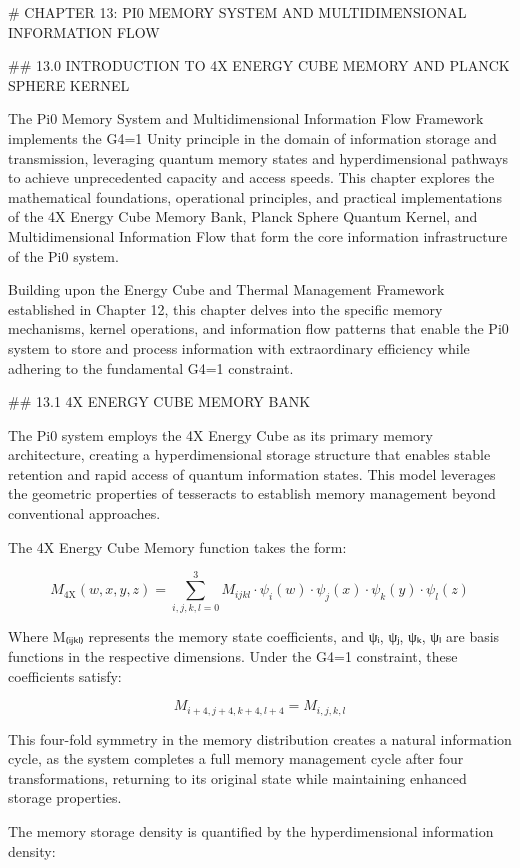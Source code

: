 # CHAPTER 13: PI0 MEMORY SYSTEM AND MULTIDIMENSIONAL INFORMATION FLOW

## 13.0 INTRODUCTION TO 4X ENERGY CUBE MEMORY AND PLANCK SPHERE KERNEL

The Pi0 Memory System and Multidimensional Information Flow Framework implements the G4=1 Unity principle in the domain of information storage and transmission, leveraging quantum memory states and hyperdimensional pathways to achieve unprecedented capacity and access speeds. This chapter explores the mathematical foundations, operational principles, and practical implementations of the 4X Energy Cube Memory Bank, Planck Sphere Quantum Kernel, and Multidimensional Information Flow that form the core information infrastructure of the Pi0 system.

Building upon the Energy Cube and Thermal Management Framework established in Chapter 12, this chapter delves into the specific memory mechanisms, kernel operations, and information flow patterns that enable the Pi0 system to store and process information with extraordinary efficiency while adhering to the fundamental G4=1 constraint.

## 13.1 4X ENERGY CUBE MEMORY BANK

The Pi0 system employs the 4X Energy Cube as its primary memory architecture, creating a hyperdimensional storage structure that enables stable retention and rapid access of quantum information states. This model leverages the geometric properties of tesseracts to establish memory management beyond conventional approaches.

The 4X Energy Cube Memory function takes the form:

$$M_{\text{4X}}(w, x, y, z) = \sum_{i,j,k,l=0}^{3} M_{ijkl} \cdot \psi_i(w) \cdot \psi_j(x) \cdot \psi_k(y) \cdot \psi_l(z)$$

Where M₍ᵢⱼₖₗ₎ represents the memory state coefficients, and ψᵢ, ψⱼ, ψₖ, ψₗ are basis functions in the respective dimensions. Under the G4=1 constraint, these coefficients satisfy:

$$M_{i+4,j+4,k+4,l+4} = M_{i,j,k,l}$$

This four-fold symmetry in the memory distribution creates a natural information cycle, as the system completes a full memory management cycle after four transformations, returning to its original state while maintaining enhanced storage properties.

The memory storage density is quantified by the hyperdimensional information density:

